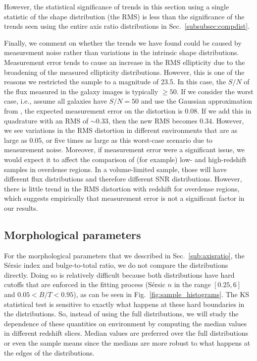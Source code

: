 \documentclass[twocolumn,useAMS,usenatbib]{mn2e}
\newcommand{\sersic}{S\'{e}rsic }
\begin{document}
However, the statistical significance of
trends in this section using a single statistic of the shape
distribution (the RMS) is less than the significance of the trends
seen using the entire axis ratio distributions in Sec.~\ref{subsubsec:compdist}.

Finally, we comment on whether the trends we
  have found could be caused by measurement noise rather than
  variations in the intrinsic shape distributions.  Measurement error
  tends to cause an increase in the RMS ellipticity due to the
  broadening of the measured ellipticity distributions.  However, this
is one of the reasons we restricted the sample to a magnitude of
23.5.  In this case, the $S/N$ of the flux measured in the galaxy
images is typically $\ge 50$.  If we consider the worst case, i.e.,
assume all galaxies have $S/N=50$ and use the Gaussian approximation
from \cite{BJ02}, the expected measurement error on the distortion is
$0.08$.  If we add this in quadrature with an RMS of $\sim 0.33$, then
the new RMS becomes $0.34$.  However, we see variations in the RMS
distortion in different environments that are as large as $0.05$, or
five times as large as this worst-case scenario due to measurement
noise.   Moreover, if measurement error were a significant issue, we
would expect it to affect the comparison of (for example) low- and
high-redshift samples in overdense regions.  In a volume-limited
sample, those will have different flux distributions and therefore
different SNR distributions.  However, there is little trend in the
RMS distortion with redshift for overdense regions, which suggests
empirically that measurement error is not a significant factor in our results.

\subsection{Morphological parameters}

For the morphological parameters that we described in
Sec.~\ref{sub:axisratio}, the \sersic index and bulge-to-total ratio,
we do not compare the distributions directly.  Doing so is relatively difficult 
because both distributions have hard cutoffs that are enforced
in the fitting process (\sersic $n$ in the range $[0.25, 6]$ and
$0.05<B/T<0.95$), as can be seen in Fig.~\ref{fig:sample_histograms}.
The KS statistical test is sensitive to exactly what happens at these hard boundaries in the distributions.
So, instead of using the full distributions, we will study the
dependence of these quantities on environment by computing the median
values in different redshift slices.  Median values are preferred
over the full distributions or even the sample means since the medians
are more robust to what happens at the edges of the distributions.
\end{document}
